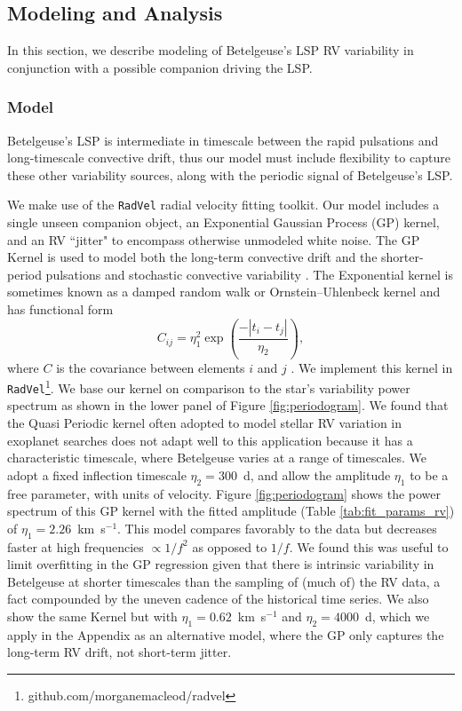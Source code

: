 \documentclass[twocolumn]{aastex631}
\begin{document}
\subsection{Modeling and Analysis}

In this section, we describe modeling of Betelgeuse's LSP RV variability in conjunction with a possible companion driving the LSP. 

\subsubsection{Model}
Betelgeuse's LSP is intermediate in timescale between the rapid pulsations and long-timescale convective drift, thus our model must include flexibility to capture these other variability sources, along with the periodic signal of Betelgeuse's LSP. 

We make use of the {\tt RadVel} \citep{2018PASP..130d4504F} radial velocity fitting toolkit. Our model includes a single unseen companion object, an Exponential Gaussian Process (GP) kernel, and an RV ``jitter" to encompass otherwise unmodeled white noise. The GP Kernel is used to model both the long-term convective drift and the shorter-period pulsations and stochastic convective variability \citep[e.g.][]{2023AJ....166...62B}. The Exponential kernel is sometimes known as a damped random walk or Ornstein–Uhlenbeck kernel and has functional form 
\begin{equation}
    C_{ij} = \eta_1^2 \exp  \left(\frac{ -|t_i - t_j| }{ \eta_2 }\right),
\end{equation}
where $C$ is the covariance between elements $i$ and $j$ \citep{2023ARA&A..61..329A}. We implement this kernel in {\tt RadVel}\footnote{github.com/morganemacleod/radvel}.
We base our kernel on comparison to the star's variability power spectrum as shown in the lower panel of Figure \ref{fig:periodogram}. We found that the Quasi Periodic kernel often adopted to model stellar RV variation in exoplanet searches does not adapt well to this application because it has a  characteristic timescale, where Betelgeuse varies at a range of timescales. We adopt a fixed inflection timescale $\eta_2 = 300$~d, and allow the amplitude $\eta_1$ to be a free parameter, with units of velocity. Figure \ref{fig:periodogram} shows the power spectrum of this GP kernel with the fitted amplitude (Table \ref{tab:fit_params_rv}) of $\eta_1=2.26$~km~s$^{-1}$. This model compares favorably to the data but decreases faster at high frequencies $\propto 1/f^2$ as opposed to $1/f$. We found this was useful to limit overfitting in the GP regression given that there is intrinsic variability in Betelgeuse at shorter timescales than the sampling of (much of) the RV data, a fact compounded by the uneven cadence of the historical time series. We also show the same Kernel but with $\eta_1=0.62$~km~s$^{-1}$ and $\eta_2=4000$~d, which we apply in the Appendix as an alternative model, where the GP only captures the long-term RV drift, not short-term jitter. 
\end{document}
